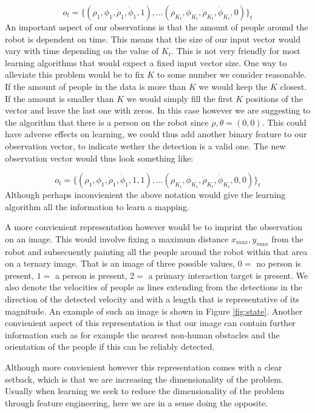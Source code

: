 \documentclass[letterpaper, 10 pt, conference]{ieeeconf}
\begin{document}
\begin{equation}
 	o_t = \{(\rho_1,\phi_1,\dot{\rho}_1,\dot{\phi}_1,1),... (\rho_{K_t},\phi_{K_t},\dot{\rho}_{K_t},\dot{\phi}_{K_t},0)\}_t
\end{equation}
An important aspect of our observations is that the amount of people around the robot is dependent on time. This means that the size of our input vector would vary with time depending on the value of $K_t$. This is not very friendly for most learning algorithms that would expect a fixed input vector size. One way to alleviate this problem would be to fix $K$ to some number we consider reasonable. If the amount of people in the data is more than $K$ we would keep the $K$ closest. If the amount is smaller than $K$ we would simply fill the first $K$ positions of the vector and leave the last one with zeros. In this case however we are suggesting to the algorithm that there is a person on the robot since $\rho,\theta = (0,0)$. This could have adverse effects on learning, we could thus add another binary feature to our observation vector, to indicate wether the detection is a valid one. The new observation vector would thus look something like:

\begin{equation}
 	o_t = \{(\rho_1,\phi_1,\dot{\rho}_1,\dot{\phi}_1,1,1),... (\rho_{K_t},\phi_{K_t},\dot{\rho}_{K_t},\dot{\phi}_{K_t},0,0)\}_t
\end{equation}
Although perhaps inconvienient the above notation would give the learning algorithm all the information to learn a mapping. 

A more convienient representation however would be to imprint the observation on an image. This would involve fixing a maximum distance $x_{max},y_{max}$ from the robot and subsecuently painting all the people around the robot within that area on a ternary image. That is an image of three possible values, $0=$ no person is present, $1=$ a person is present, $2=$ a primary interaction target is present. We also denote the velocities of people as lines extending from the detections in the direction of the detected velocity and with a length that is representative of its magnitude. An example of such an image is shown in Figure \ref{fig:state}. Another convienient aspect of this representation is that our image can contain further information such as for example the nearest non-human obstacles and the orientation of the people if this can be reliably detected. 

Although more convienient however this representation comes with a clear setback, which is that we are increasing the dimensionality of the problem. Usually when learning we seek to reduce the dimensionality of the problem through feature engineering, here we are in a sense doing the opposite. 
\end{document}
